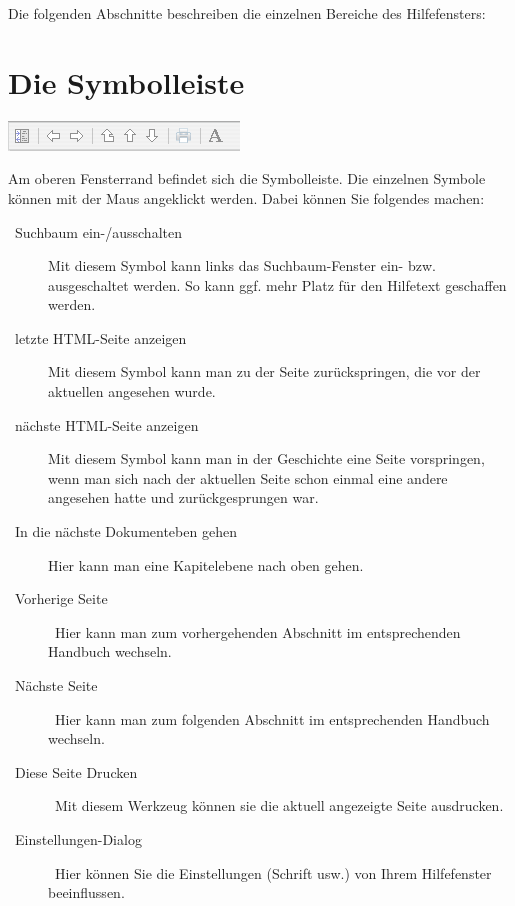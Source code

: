 Die folgenden Abschnitte beschreiben die einzelnen Bereiche des Hilfefensters:

\section{Die Symbolleiste}
\label{sec:die-symbolleiste}

\ifhtml
{}%
\else
\includegraphics{helptoolbar}
\fi

Am oberen Fensterrand befindet sich die Symbolleiste. Die einzelnen Symbole können mit der Maus angeklickt werden. Dabei können Sie folgendes machen:

\begin{description}
\item[~Suchbaum ein-/ausschalten] Mit diesem Symbol kann links das Suchbaum-Fenster ein- bzw. ausgeschaltet werden. So kann ggf. mehr Platz für den Hilfetext geschaffen werden.
\item[~letzte HTML-Seite anzeigen] Mit diesem Symbol kann man zu der Seite zurückspringen, die vor der aktuellen angesehen wurde.
\item[~nächste HTML-Seite anzeigen] Mit diesem Symbol kann man in der Geschichte eine Seite vorspringen, wenn man sich nach der aktuellen Seite schon einmal eine andere angesehen hatte und zurückgesprungen war.
\item[~In die nächste Dokumenteben gehen] Hier kann man eine Kapitelebene nach oben gehen.
\item[~Vorherige Seite]~Hier kann man zum vorhergehenden Abschnitt im entsprechenden Handbuch wechseln.
\item[~Nächste Seite]~Hier kann man zum folgenden Abschnitt im entsprechenden Handbuch wechseln.
\item[~Diese Seite Drucken]~Mit diesem Werkzeug können sie die aktuell angezeigte Seite ausdrucken.
\item[~Einstellungen-Dialog]~Hier können Sie die Einstellungen (Schrift usw.) von Ihrem Hilfefenster beeinflussen. 
\end{description}

